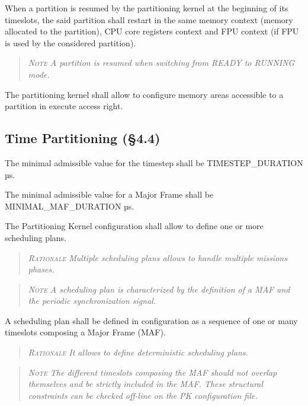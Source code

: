 When a partition is resumed by the partitioning kernel at the beginning of its timeslots, the said partition shall restart in the same memory context (memory allocated to the partition), CPU core registers context and FPU context (if FPU is used by the considered partition).
\begin{quote}\it
\textsc{Note}
A partition is resumed when switching from READY to RUNNING mode.
\end{quote}

The partitioning kernel shall allow to configure memory areas accessible to a partition in execute access right.

\subsection{Time Partitioning (\S4.4)}

The minimal admissible value for the timestep shall be TIMESTEP\_DURATION µs.

The minimal admissible value for a Major Frame shall be MINIMAL\_MAF\_DURATION µs.

The Partitioning Kernel configuration shall allow to define one or more scheduling plans.
\begin{quote}\it
\textsc{Rationale}
Multiple scheduling plans allows to handle multiple missions phases.
\end{quote}
\begin{quote}\it
\textsc{Note}
A scheduling plan is characterized by the definition of a MAF and the periodic synchronization signal.
\end{quote}

A scheduling plan shall be defined in configuration as a sequence of one or many timeslots composing a Major Frame (MAF).
\begin{quote}\it
\textsc{Rationale}
It allows to define deterministic scheduling plans.
\end{quote}
\begin{quote}\it
\textsc{Note}
The different timeslots composing the MAF should not overlap themselves and be strictly included in the MAF. These structural constraints can be checked off-line on the PK configuration file.
\end{quote}

